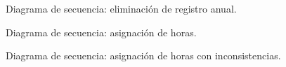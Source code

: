 \begin{figure}
\centering
{}
\caption{Diagrama de secuencia: eliminación de registro anual.}
\label{fig:eliminacion_registro}
\end{figure}

\begin{figure}
\centering
{}
\caption{Diagrama de secuencia: asignación de horas.}
\label{fig:asignacion_horas}
\end{figure}

\begin{figure}
\centering
{}
\caption{Diagrama de secuencia: asignación de horas con inconsistencias.}
\label{fig:asignacion_horas_inconsistencia}
\end{figure}



